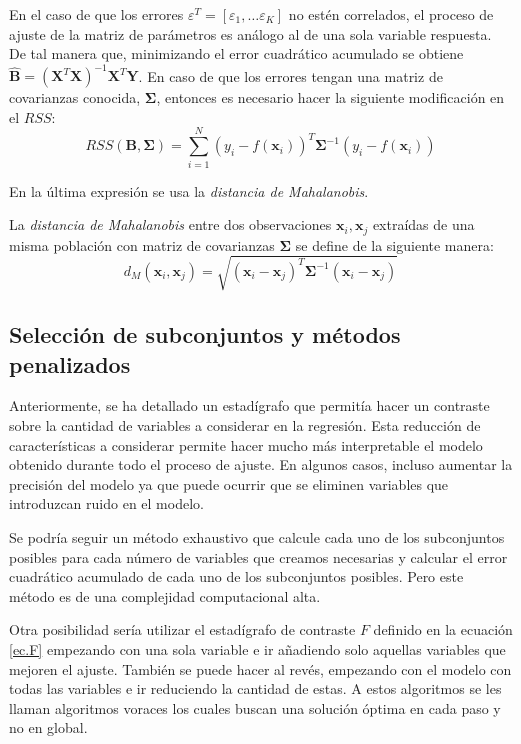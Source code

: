\noindent En el caso de que los errores $\varepsilon^T=[\varepsilon_1,\ldots \varepsilon_K]$ no estén correlados, el proceso de ajuste de la matriz de parámetros es análogo al de una sola variable respuesta. De tal manera que, minimizando el error cuadrático acumulado se obtiene $\hat{\textbf{B}}=(\textbf{X}^T\textbf{X})^{-1}\textbf{X}^T\textbf{Y}$. En caso de que los errores tengan una matriz de covarianzas conocida, $\mathbf{\Sigma}$, entonces es necesario hacer la siguiente modificación en el $RSS$:
\begin{equation}
RSS(\textbf{B},\mathbf{\Sigma})=\sum_{i=1}^N(y_i-f(\textbf{x}_i))^T \mathbf{\Sigma}^{-1} (y_i-f(\textbf{x}_i))
\end{equation}

\noindent En la última expresión se usa la \textit{distancia de Mahalanobis}.
\begin{defi}\label{Mahalanobis}
La \textit{distancia de Mahalanobis} entre dos observaciones $\textbf{x}_i, \textbf{x}_j$ extraídas de una misma población con matriz de covarianzas $\mathbf{\Sigma}$ se define de la siguiente manera\cite{Cuadras 2014}: 
\begin{equation}
d_M(\textbf{x}_i, \textbf{x}_j)=\sqrt{(\textbf{x}_i- \textbf{x}_j)^T \mathbf{\Sigma}^{-1}(\textbf{x}_i-\textbf{x}_j)}
\end{equation}
\end{defi}

\subsection*{Selección de subconjuntos y métodos penalizados}

\noindent Anteriormente, se ha detallado un estadígrafo que permitía hacer un contraste sobre la cantidad de variables a considerar en la regresión. 
Esta reducción de características a considerar permite hacer mucho más interpretable el modelo obtenido durante todo el proceso de ajuste. En algunos casos,  incluso aumentar la precisión del modelo ya que puede ocurrir que se eliminen variables que introduzcan ruido en el modelo. 

\noindent Se podría seguir un método exhaustivo que calcule cada uno de los subconjuntos posibles para cada número de variables que creamos necesarias y calcular el error cuadrático acumulado de cada uno de los subconjuntos posibles. Pero este método es de una complejidad computacional alta. 

\noindent Otra posibilidad sería utilizar el estadígrafo de contraste $F$ definido en la ecuación \eqref{ec.F} empezando con una sola variable e ir añadiendo solo aquellas variables que mejoren el ajuste. También se puede hacer al revés, empezando con el modelo con todas las variables e ir reduciendo la cantidad de estas. A estos algoritmos se les llaman algoritmos voraces los cuales buscan una solución óptima en cada paso y no en global. 

